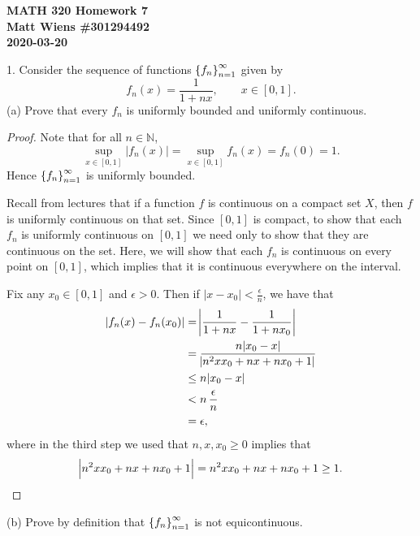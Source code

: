 \documentclass{article}
\newcommand{\N}{\mathbb{N}}
\begin{document}
\textbf{MATH 320 Homework 7} \\
\textbf{Matt Wiens \#301294492} \\
\textbf{2020-03-20}

1. Consider the sequence of functions $\cbr{f_n}_{ n =1}^\infty$ given
by
%
\begin{equation*}
    f_n(x) = \frac{1}{1 + n x},
    \qquad
    x \in [0, 1]
    .
\end{equation*}
%
(a) Prove that every $f_n$ is uniformly bounded and uniformly continuous.

\begin{proof}

Note that for all $n \in \N$,
%
\begin{equation*}
    \sup_{x \in [0, 1]} |f_n(x)|
    = \sup_{x \in [0, 1]} f_n(x)
    = f_n(0)
    = 1
    .
\end{equation*}
%
Hence $\cbr{f_n}_{n = 1}^\infty$ is uniformly bounded.

Recall from lectures that if a function $f$ is continuous on a compact
set $X$, then $f$ is uniformly continuous on that set. Since $[0, 1]$ is
compact, to show that each $f_n$ is uniformly continuous on $[0, 1]$ we
need only to show that they are continuous on the set. Here, we will show
that each $f_n$ is continuous on every point on $[0, 1]$, which implies
that it is continuous everywhere on the interval.

Fix any $x_0 \in [0, 1]$ and $\epsilon > 0$. Then if $|x - x_0| <
\frac{\epsilon}{n}$, we have that
%
\begin{align*}
    |f_n(x) - f_n(x_0)|
        &= \envert{\frac{1}{1 + n x} - \frac{1}{1 + n x_0}} \\
        &= \frac{n |x_0 - x|}{\envert{n^2 x x_0 + n x + n x_0 + 1}} \\
        &\leq n |x_0 - x| \\
        &< n \, \frac{\epsilon}{n} \\
        &= \epsilon
        ,
\end{align*}
%
where in the third step we used that $n, x, x_0 \geq 0$ implies that
%
\begin{equation*}
    \envert{n^2 x x_0 + n x + n x_0 + 1}
    = n^2 x x_0 + n x + n x_0 + 1
    \geq 1
    .
\end{equation*}

\end{proof}

(b) Prove by definition that $\cbr{f_n}_{n = 1}^\infty$ is not
equicontinuous.
\end{document}
